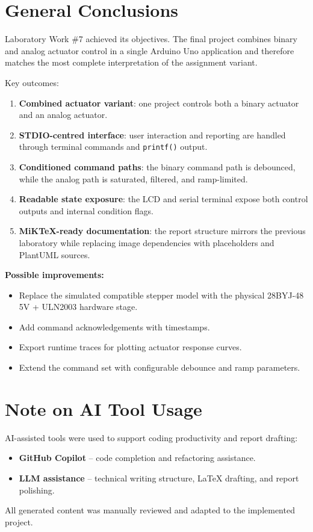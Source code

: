 \documentclass[12pt]{article}
\begin{document}
\section*{General Conclusions}
\hspace{0.8cm} Laboratory Work \#7 achieved its objectives. The final project combines binary and analog actuator control in a single Arduino Uno application and therefore matches the most complete interpretation of the assignment variant.

Key outcomes:
\begin{enumerate}
    \item \textbf{Combined actuator variant}: one project controls both a binary actuator and an analog actuator.
    \item \textbf{STDIO-centred interface}: user interaction and reporting are handled through terminal commands and \texttt{printf()} output.
    \item \textbf{Conditioned command paths}: the binary command path is debounced, while the analog path is saturated, filtered, and ramp-limited.
    \item \textbf{Readable state exposure}: the LCD and serial terminal expose both control outputs and internal condition flags.
    \item \textbf{MiKTeX-ready documentation}: the report structure mirrors the previous laboratory while replacing image dependencies with placeholders and PlantUML sources.
\end{enumerate}

\textbf{Possible improvements:}
\begin{itemize}
    \item Replace the simulated compatible stepper model with the physical 28BYJ-48 5V + ULN2003 hardware stage.
    \item Add command acknowledgements with timestamps.
    \item Export runtime traces for plotting actuator response curves.
    \item Extend the command set with configurable debounce and ramp parameters.
\end{itemize}

\section*{Note on AI Tool Usage}
\hspace{0.8cm} AI-assisted tools were used to support coding productivity and report drafting:
\begin{itemize}
    \item \textbf{GitHub Copilot} -- code completion and refactoring assistance.
    \item \textbf{LLM assistance} -- technical writing structure, LaTeX drafting, and report polishing.
\end{itemize}
All generated content was manually reviewed and adapted to the implemented project.
\end{document}
